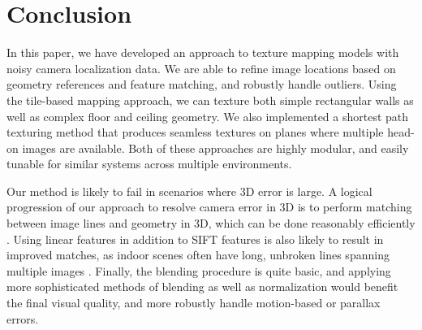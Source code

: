 \documentclass[]{spie}  %
\begin{document}
\section{Conclusion}
\label{sec:conclusion}

In this paper, we have developed an approach to texture mapping models
with noisy camera localization data. We are able to refine image
locations based on geometry references and feature matching, and
robustly handle outliers. Using the tile-based mapping approach, we
can texture both simple rectangular walls as well as complex floor and
ceiling geometry. We also implemented a shortest path texturing method
that produces seamless textures on planes where multiple head-on
images are available. Both of these approaches are highly modular, and
easily tunable for similar systems across multiple environments.

Our method is likely to fail in scenarios where 3D error is large. A
logical progression of our approach to resolve camera error in 3D is
to perform matching between image lines and geometry in 3D, which can
be done reasonably efficiently \cite{linebased,
  rectangularstructures}. Using linear features in addition to SIFT
features is also likely to result in improved matches, as indoor
scenes often have long, unbroken lines spanning multiple images
\cite{linearposeestimation}. Finally, the blending procedure is quite
basic, and applying more sophisticated methods of blending as well as
normalization would benefit the final visual quality, and more
robustly handle motion-based or parallax errors.
\end{document}
